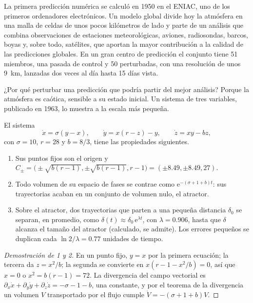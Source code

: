 La primera predicción numérica se calculó en 1950 en el ENIAC, uno de los primeros ordenadores
electrónicos. Un modelo global divide hoy la atmósfera en una malla de celdas de unos pocos kilómetros
de lado y parte de un análisis que combina observaciones de estaciones meteorológicas, aviones,
radiosondas, barcos, boyas y, sobre todo, satélites, que aportan la mayor contribución a la
calidad de las predicciones globales. En un gran centro de predicción el conjunto
tiene 51 miembros, una pasada de control y 50 perturbadas, con una resolución de unos \qty{9}{km}, lanzadas
dos veces al día hasta 15 días vista.

¿Por qué perturbar una predicción que podría partir del mejor análisis? Porque la atmósfera es
caótica, sensible a su estado inicial. Un sistema de tres variables, publicado en 1963, lo muestra
a la escala más pequeña.

\begin{proposition}\label{prop:b2:weather-systems:lorenz}
El sistema
\[
  \dot x = \sigma(y - x), \qquad \dot y = x(r - z) - y, \qquad \dot z = xy - bz,
\]
con $\sigma = 10$, $r = 28$ y $b = 8/3$, tiene las propiedades siguientes.
\begin{enumerate}
  \item Sus puntos fijos son el origen y $C_\pm = \bigl(\pm\sqrt{b(r - 1)}, \pm\sqrt{b(r - 1)},
        r - 1\bigr) = (\pm 8.49, \pm 8.49, 27)$.
  \item Todo volumen de su espacio de fases se contrae como $\mathrm{e}^{-(\sigma + 1 + b)t}$: sus
        trayectorias acaban en un conjunto de volumen nulo, el atractor.
  \item Sobre el atractor, dos trayectorias que parten a una pequeña distancia $\delta_0$ se separan,
        en promedio, como $\delta(t) \approx \delta_0\,\mathrm{e}^{\lambda t}$, con $\lambda =
        0.906$, hasta que $\delta$ alcanza el tamaño del atractor (calculado, se admite). Los errores
        pequeños se duplican cada $\ln 2/\lambda = 0.77$ unidades de tiempo.
\end{enumerate}
\end{proposition}

\begin{proof}[Demostración de 1 y 2]
En un punto fijo, $y = x$ por la primera ecuación; la tercera da $z = x^2/b$; la segunda
se convierte en $x(r - 1 - x^2/b) = 0$, así que $x = 0$ o $x^2 = b(r - 1) = 72$. La divergencia del
campo vectorial es $\partial_x\dot x + \partial_y\dot y + \partial_z\dot z = -\sigma - 1 - b$, una
constante, y por el teorema de la divergencia un volumen $V$ transportado por el flujo cumple $\dot V =
-(\sigma + 1 + b)V$.
\end{proof}

